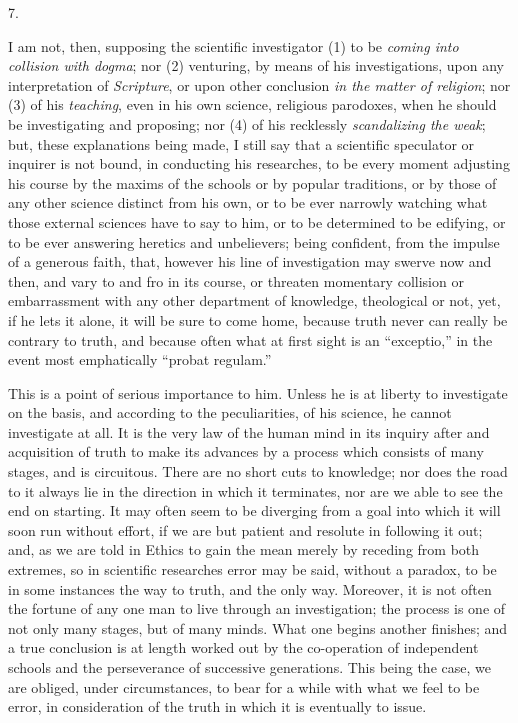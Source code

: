 7.

I am not, then, supposing the scientific investigator (1) to be \emph{coming
into collision with dogma}; nor (2) venturing, by means of his
investigations, upon any interpretation of \emph{Scripture}, or upon
other conclusion \emph{in the matter of religion}; nor (3) of his \emph{teaching},
even in his own science, religious parodoxes, when he should be
investigating and proposing; nor (4) of his recklessly \emph{scandalizing
the weak}; but, these explanations being made, I still say that a
scientific speculator or inquirer is not bound, in conducting his
researches, to be every moment adjusting his course by the
maxims of the schools or by popular traditions, or by those of any
other science distinct from his own, or to be ever narrowly watching
what those external sciences have to say to him, or to be determined
to be edifying, or to be ever answering heretics and unbelievers;
being confident, from the impulse of a generous faith, that, however
his line of investigation may swerve now and then, and vary to and fro
in its course, or threaten momentary collision or embarrassment with
any other department of knowledge, theological or not, yet, if he lets
it alone, it will be sure to come home, because truth never can really
be contrary to truth, and because often what at first sight is an
``exceptio,'' in the event most emphatically ``probat
regulam.''

This is a point of serious importance to him. Unless he is at
liberty to investigate on the basis, and according to the
peculiarities, of his science, he cannot investigate at all. It is the
very law of the human mind in its inquiry after and acquisition of
truth to make its advances by a process which consists of many stages,
and is circuitous. There are no short cuts to knowledge; nor does the
road to it always lie in the direction in which it terminates, nor are
we able to see the end on starting. It may often seem to be diverging
from a goal into which it will soon run without effort, if we are but
patient and resolute in following it out; and, as we are told in
Ethics to gain the mean merely by receding from both extremes, so in
scientific researches error may be said, without a paradox, to be in
some instances the way to truth, and the only way. Moreover, it is not
often the fortune of any one man to live through an investigation; the
process is one of not only many stages, but of many minds. What one
begins another finishes; and a true conclusion is at length worked out
by the co-operation of independent schools and the perseverance
of successive generations. This being the case, we are obliged, under
circumstances, to bear for a while with what we feel to be error, in
consideration of the truth in which it is eventually to issue.

